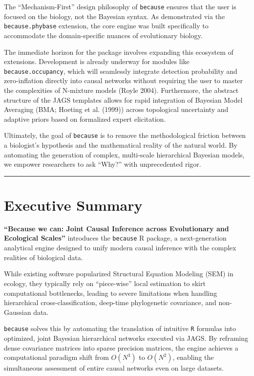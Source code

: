 \documentclass[
]{article}
\begin{document}
The ``Mechanism-First'' design philosophy of \texttt{because} ensures that the user is focused on the biology, not the Bayesian syntax. As demonstrated via the \texttt{because.phybase} extension, the core engine was built specifically to accommodate the domain-specific nuances of evolutionary biology.

The immediate horizon for the package involves expanding this ecosystem of extensions. Development is already underway for modules like \texttt{because.occupancy}, which will seamlessly integrate detection probability and zero-inflation directly into causal networks without requiring the user to master the complexities of N-mixture models (Royle 2004). Furthermore, the abstract structure of the JAGS templates allows for rapid integration of Bayesian Model Averaging (BMA; Hoeting et al. (1999)) across topological uncertainty and adaptive priors based on formalized expert elicitation.

Ultimately, the goal of \texttt{because} is to remove the methodological friction between a biologist's hypothesis and the mathematical reality of the natural world. By automating the generation of complex, multi-scale hierarchical Bayesian models, we empower researchers to ask ``Why?'' with unprecedented rigor.

\begin{center}\rule{0.5\linewidth}{0.5pt}\end{center}

\section{Executive Summary}\label{executive-summary}

\textbf{``Because we can: Joint Causal Inference across Evolutionary and Ecological Scales''} introduces the \texttt{because} R package, a next-generation analytical engine designed to unify modern causal inference with the complex realities of biological data.

While existing software popularized Structural Equation Modeling (SEM) in ecology, they typically rely on ``piece-wise'' local estimation to skirt computational bottlenecks, leading to severe limitations when handling hierarchical cross-classification, deep-time phylogenetic covariance, and non-Gaussian data.

\texttt{because} solves this by automating the translation of intuitive \texttt{R} formulas into optimized, joint Bayesian hierarchical networks executed via JAGS. By reframing dense covariance matrices into sparse precision matrices, the engine achieves a computational paradigm shift from \(O(N^3)\) to \(O(N^2)\), enabling the simultaneous assessment of entire causal networks even on large datasets.
\end{document}
